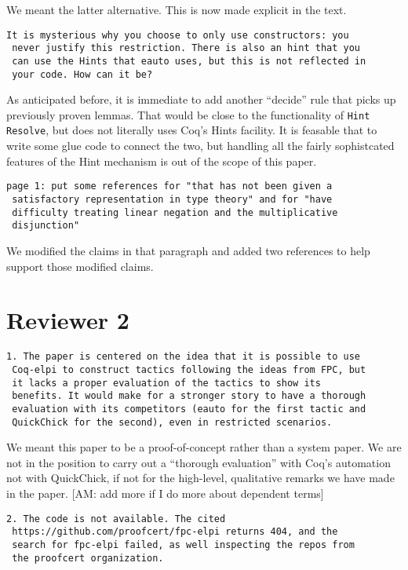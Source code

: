 \documentclass{article}
\begin{document}
We meant the latter alternative. This is now made explicit in the text.

\begin{verbatim}
It is mysterious why you choose to only use constructors: you
 never justify this restriction. There is also an hint that you
 can use the Hints that eauto uses, but this is not reflected in
 your code. How can it be?
\end{verbatim}
As anticipated before, it is immediate to add another ``decide'' rule
that picks up previously proven lemmas. That would be close to the
functionality of \texttt{Hint Resolve}, but does not literally uses
Coq's Hints facility. It is feasable that to write some glue
code to connect the two, but handling all the fairly sophistcated features of the Hint
mechanism is out of the scope of this paper.

\begin{verbatim}
page 1: put some references for "that has not been given a
 satisfactory representation in type theory" and for "have
 difficulty treating linear negation and the multiplicative
 disjunction"
\end{verbatim}

We modified the claims in that paragraph and added two references
to help support those modified claims.

\section*{Reviewer 2}

\begin{verbatim}
1. The paper is centered on the idea that it is possible to use
 Coq-elpi to construct tactics following the ideas from FPC, but
 it lacks a proper evaluation of the tactics to show its
 benefits. It would make for a stronger story to have a thorough
 evaluation with its competitors (eauto for the first tactic and
 QuickChick for the second), even in restricted scenarios.
\end{verbatim}

We meant this paper to be a proof-of-concept rather than a system
paper. We are not in the position to carry out a ``thorough evaluation'' with
Coq's automation not with QuickChick, if not for the high-level, qualitative remarks we have made in the paper. [AM: add more if I do more about dependent terms]


\begin{verbatim}
2. The code is not available. The cited
 https://github.com/proofcert/fpc-elpi returns 404, and the
 search for fpc-elpi failed, as well inspecting the repos from
 the proofcert organization.
\end{verbatim}
\end{document}
